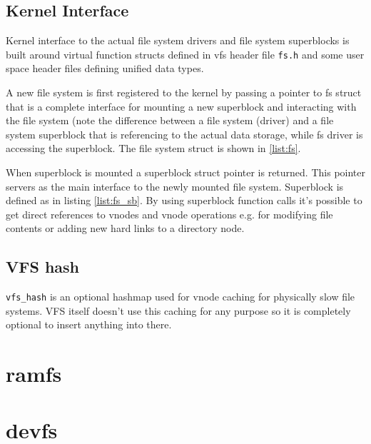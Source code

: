 \section{Kernel Interface}

Kernel interface to the actual file system drivers and file system superblocks
is built around virtual function structs defined in \acs{vfs} header file
\verb+fs.h+ and some user space header files defining unified data types.

A new file system is first registered to the kernel by passing a pointer to
fs struct that is a complete interface for mounting a new superblock and
interacting with the file system (note the difference between a file system
(driver) and a file system superblock that is referencing to the actual data
storage, while fs driver is accessing the superblock. The file system struct
is shown in \ref{list:fs}.

When superblock is mounted a superblock struct pointer is returned. This pointer
servers as the main interface to the newly mounted file system. Superblock is
defined as in listing \ref{list:fs_sb}. By using superblock function calls it's
possible to get direct references to vnodes and \acs{vnode} operations e.g. for
modifying file contents or adding new hard links to a directory node.




\section{VFS hash}

\verb+vfs_hash+ is an optional hashmap used for vnode caching for physically
slow file systems. VFS itself doesn't use this caching for any purpose so
it is completely optional to insert anything into there.

\chapter{ramfs}


\chapter{devfs}

